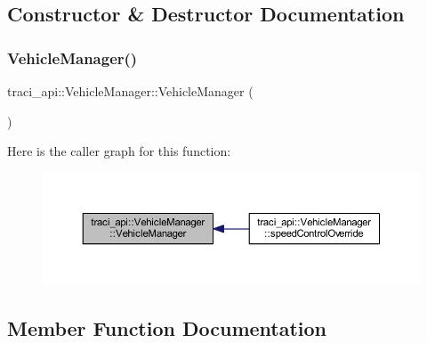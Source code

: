 \subsection{Constructor \& Destructor Documentation}
\mbox{\label{classtraci__api_1_1_vehicle_manager_a7e9e05b65776f0709f0b84a51c44377f}} 
\subsubsection{\texorpdfstring{Vehicle\+Manager()}{VehicleManager()}}
{\footnotesize\ttfamily traci\+\_\+api\+::\+Vehicle\+Manager\+::\+Vehicle\+Manager (\begin{DoxyParamCaption}\item[{\hyperlink{classtraci__api_1_1_vehicle_manager}{Vehicle\+Manager} const \&}]{ }\end{DoxyParamCaption})\hspace{0.3cm}{\ttfamily [delete]}}

Here is the caller graph for this function\+:\nopagebreak
\begin{figure}[H]
\begin{center}
\leavevmode
\includegraphics[width=350pt]{classtraci__api_1_1_vehicle_manager_a7e9e05b65776f0709f0b84a51c44377f_icgraph}
\end{center}
\end{figure}


\subsection{Member Function Documentation}
\mbox{\label{classtraci__api_1_1_vehicle_manager_a6829e259033dcd95611755953f164ef0}} 
